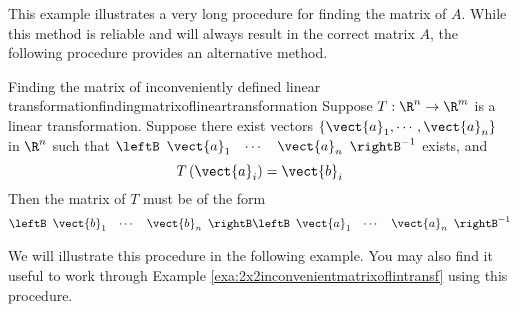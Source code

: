 This example illustrates a very long procedure for finding the matrix of $A$. While this method is reliable and
will always result in the correct matrix $A$, the following procedure provides an alternative method. 

\begin{procedure}{Finding the matrix of inconveniently defined linear transformation}{findingmatrixoflineartransformation}
Suppose $T:\R^{n}\rightarrow \R^{m}$ is a linear transformation. Suppose there exist vectors $\left\{ \vect{a}_{1},\cdots ,\vect{a}_{n}\right\} $ in $\R^{n}$ such that $\leftB
\begin{array}{ccc}
\vect{a}_{1} & \cdots & \vect{a}_{n}
\end{array}
\rightB ^{-1}$ exists, and 
\begin{equation*}
T \left(\vect{a}_{i}\right)=\vect{b}_{i}
\end{equation*}
Then the matrix of $T$ must be of the form
\begin{equation*}
\leftB
\begin{array}{ccc}
\vect{b}_{1} & \cdots & \vect{b}_{n}
\end{array}
\rightB \leftB
\begin{array}{ccc}
\vect{a}_{1} & \cdots & \vect{a}_{n}
\end{array}
\rightB ^{-1}
\end{equation*}
\end{procedure}

We will illustrate this procedure in the following example. You may also find it useful
to work through Example \ref{exa:2x2inconvenientmatrixoflintransf} using this procedure.

